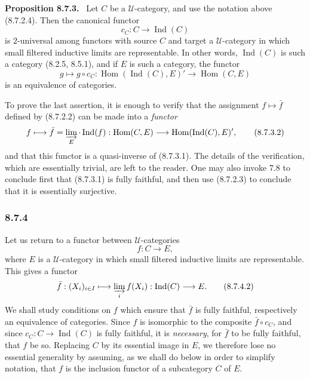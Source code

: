 \documentclass[11pt]{article}
\newcommand{\U}{\mathcal{U}}
\newcommand{\Ind}{\operatorname{Ind}}
\newcommand{\Hhom}{\operatorname{Hom}}
\newenvironment{statement}[1]{\par\medskip\noindent\textbf{#1.}\ }{\par\medskip}
\begin{document}
\begin{statement}{Proposition 8.7.3}
Let $C$ be a $\U$-category, and use the notation above (8.7.2.4). Then the canonical functor
\[
 c_C:C\longrightarrow \Ind(C)
\]
is $2$-universal among functors with source $C$ and target a $\U$-category in which small filtered inductive limits are representable. In other words, $\Ind(C)$ is such a category (8.2.5, 8.5.1), and if $E$ is such a category, the functor
\[
 g\longmapsto g\circ c_C:
 \Hhom(\Ind(C),E)'\longrightarrow \Hhom(C,E)
\tag{8.7.3.1}
\]
is an equivalence of categories.
\end{statement}

To prove the last assertion, it is enough to verify that the assignment $f\mapsto \bar f$ defined by (8.7.2.2) can be made into a \emph{functor}
\[
 f\longmapsto \bar f=\varinjlim_E\cdot\Ind(f):
 \Hhom(C,E)\longrightarrow \Hhom(\Ind(C),E)',
\tag{8.7.3.2}
\]
and that this functor is a quasi-inverse of (8.7.3.1). The details of the verification, which are essentially trivial, are left to the reader. One may also invoke 7.8 to conclude first that (8.7.3.1) is fully faithful, and then use (8.7.2.3) to conclude that it is essentially surjective.

\subsubsection*{8.7.4}
Let us return to a functor between $\U$-categories
\[
 f:C\longrightarrow E,
\tag{8.7.4.1}
\]
where $E$ is a $\U$-category in which small filtered inductive limits are representable. This gives a functor
\[
 \bar f:(X_i)_{i\in I}\longmapsto \varinjlim_i f(X_i):
 \Ind(C)\longrightarrow E.
\tag{8.7.4.2}
\]
We shall study conditions on $f$ which ensure that $\bar f$ is fully faithful, respectively an equivalence of categories. Since $f$ is isomorphic to the composite $\bar f\circ c_C$, and since $c_C:C\to\Ind(C)$ is fully faithful, it is \emph{necessary}, for $\bar f$ to be fully faithful, that $f$ be so. Replacing $C$ by its essential image in $E$, we therefore lose no essential generality by assuming, as we shall do below in order to simplify notation, that $f$ is the inclusion functor of a subcategory $C$ of $E$.
\end{document}

